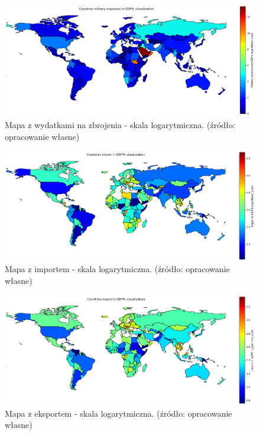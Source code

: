 \documentclass[11pt]{report}
\begin{document}
    \begin{figure}[!htp]
        \centering
        \includegraphics[width=\linewidth]{fig/CLUST/military2015.png}
        \caption{Mapa z wydatkami na zbrojenia - skala logarytmiczna. (źródło: opracowanie własne)}
        \label{fig:clustMilitary2015_log}
    \end{figure}

    \begin{figure}[!htp]
        \centering
        \includegraphics[width=\linewidth]{fig/CLUST/import2015.png}
        \caption{Mapa z importem - skala logarytmiczna. (źródło: opracowanie własne)}
        \label{fig:clustImport2015_log}
    \end{figure}

    \begin{figure}[!htp]
        \centering
        \includegraphics[width=\linewidth]{fig/CLUST/export2015.png}
        \caption{Mapa z eksportem - skala logarytmiczna. (źródło: opracowanie własne)}
        \label{fig:clustExport2015_log}
    \end{figure}
\end{document}
